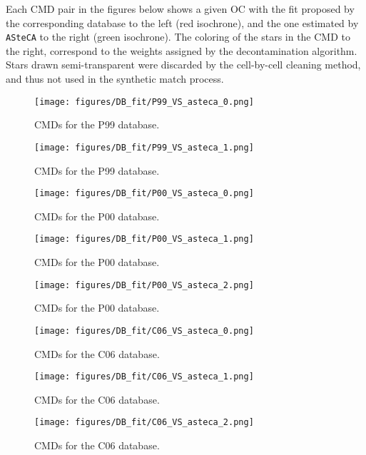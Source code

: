\documentclass{aa}
\begin{document}
\begin{appendix}
Each CMD pair in the figures below shows a given OC with the fit proposed by the
corresponding database to the left (red isochrone), and the one estimated by
\texttt{ASteCA} to the right (green isochrone).
The coloring of the stars in the CMD to the right, correspond to the weights
assigned by the decontamination algorithm. Stars drawn semi-transparent were
discarded by the cell-by-cell cleaning method, and thus not used in the
synthetic match process.

\begin{figure*}
\texttt{[image: figures/DB\_fit/P99\_VS\_asteca\_0.png]}
\caption{CMDs for the P99 database.}
\label{fig:DBs_P99_0}
\end{figure*}
\clearpage

\begin{figure*}
\texttt{[image: figures/DB\_fit/P99\_VS\_asteca\_1.png]}
\caption{CMDs for the P99 database.}
\label{fig:DBs_P99_1}
\end{figure*}
\clearpage

\begin{figure*}
\texttt{[image: figures/DB\_fit/P00\_VS\_asteca\_0.png]}
\caption{CMDs for the P00 database.}
\label{fig:DBs_P00_0}
\end{figure*}
\clearpage

\begin{figure*}
\texttt{[image: figures/DB\_fit/P00\_VS\_asteca\_1.png]}
\caption{CMDs for the P00 database.}
\label{fig:DBs_P00_1}
\end{figure*}
\clearpage

\begin{figure*}
\texttt{[image: figures/DB\_fit/P00\_VS\_asteca\_2.png]}
\caption{CMDs for the P00 database.}
\label{fig:DBs_P00_2}
\end{figure*}
\clearpage

\begin{figure*}
\texttt{[image: figures/DB\_fit/C06\_VS\_asteca\_0.png]}
\caption{CMDs for the C06 database.}
\label{fig:DBs_C06_0}
\end{figure*}
\clearpage

\begin{figure*}
\texttt{[image: figures/DB\_fit/C06\_VS\_asteca\_1.png]}
\caption{CMDs for the C06 database.}
\label{fig:DBs_C06_1}
\end{figure*}
\clearpage

\begin{figure*}
\texttt{[image: figures/DB\_fit/C06\_VS\_asteca\_2.png]}
\caption{CMDs for the C06 database.}
\label{fig:DBs_C06_2}
\end{figure*}
\clearpage


\end{appendix}
\end{document}
